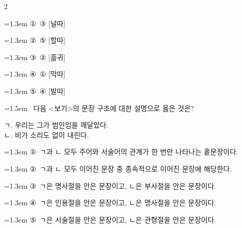 \documentclass[10pt, a4paper]{article}
\begin{document}
\begin{multicols}{2}
\begin{minipage}{\columnwidth}
\vspace{0.5mm}
{\hangindent=1.3em  \noindent\hspace{0.3em}①~③ [널따]\par}
{\hangindent=1.3em  \noindent\hspace{0.3em}②~⑤ [할따]\par}
{\hangindent=1.3em  \noindent\hspace{0.3em}③~② [흘귀]\par}
{\hangindent=1.3em  \noindent\hspace{0.3em}④~① [막따]\par}
{\hangindent=1.3em  \noindent\hspace{0.3em}⑤~④ [발따]\par}
\vspace{4mm}
\end{minipage}
\par

\noindent\begin{minipage}{\columnwidth}
\vspace{2mm}
{\hangindent=1.5em  ~다음 <보기>의 문장 구조에 대한 설명으로 옳은 것은?\par}

\vspace{1mm}
\begin{boxibox}
ㄱ. 우리는 그가 범인임을 깨달았다. \\
ㄴ. 비가 소리도 없이 내린다. \\
\end{boxibox}
\vspace{1mm}

\vspace{0.5mm}
{\hangindent=1.3em  \noindent\hspace{0.3em}①~ㄱ과 ㄴ 모두 주어와 서술어의 관계가 한 번만 나타나는 홑문장이다.\par}
{\hangindent=1.3em  \noindent\hspace{0.3em}②~ㄱ과 ㄴ 모두 이어진 문장 중 종속적으로 이어진 문장에 해당한다.\par}
{\hangindent=1.3em  \noindent\hspace{0.3em}③~ㄱ은 명사절을 안은 문장이고, ㄴ은 부사절을 안은 문장이다.\par}
{\hangindent=1.3em  \noindent\hspace{0.3em}④~ㄱ은 인용절을 안은 문장이고, ㄴ은 명사절을 안은 문장이다.\par}
{\hangindent=1.3em  \noindent\hspace{0.3em}⑤~ㄱ은 서술절을 안은 문장이고, ㄴ은 관형절을 안은 문장이다.\par}
\vspace{4mm}
\end{minipage}
\par


\end{multicols}
\end{document}
